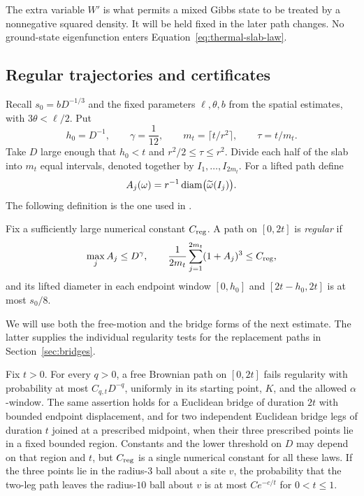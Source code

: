 The extra variable $W'$ is what permits a mixed Gibbs state to be
treated by a nonnegative squared density.  It will be held fixed
in the later path changes.  No ground-state eigenfunction enters
Equation~\eqref{eq:thermal-slab-law}.

\subsection{Regular trajectories and certificates}

Recall $s_0=bD^{-1/3}$ and the fixed parameters
$\ell,\theta,b$ from the spatial estimates, with
$3\theta<\ell/2$.  Put
\begin{equation}\label{eq:regularity-scales}
 h_0=D^{-1},\qquad \gamma=\frac1{12},\qquad
 m_t=\lceil t/r^2\rceil,\qquad \tau=t/m_t.
\end{equation}
Take $D$ large enough that $h_0<t$ and
$r^2/2\le\tau\le r^2$.  Divide each half of the slab into
$m_t$ equal intervals, denoted together by $I_1,\ldots,I_{2m_t}$.
For a lifted path define
\[
 A_j(\omega)=r^{-1}\operatorname{diam}\bigl(\widetilde\omega(I_j)\bigr).
\]
The following definition is the one used in
\citet[Section ``A stationary sample of hard-core paths,''
definition of a regular path]{HS}.

\begin{definition}\label{def:regular}
Fix a sufficiently large numerical constant $C_{\rm reg}$.
A path on $[0,2t]$ is \emph{regular} if
\begin{equation}\label{eq:regularity-tests}
 \max_j A_j\le D^\gamma,
 \qquad
 \frac1{2m_t}\sum_{j=1}^{2m_t}(1+A_j)^3\le C_{\rm reg},
\end{equation}
and its lifted diameter in each endpoint window
$[0,h_0]$ and $[2t-h_0,2t]$ is at most $s_0/8$.
\end{definition}

We will use both the free-motion and the bridge forms of the next
estimate.  The latter supplies the individual regularity tests
for the replacement paths in Section~\ref{sec:bridges}.

\begin{lemma}\label{lem:free-cutoffs}
Fix $t>0$.  For every $q>0$, a free Brownian path on $[0,2t]$
fails regularity with probability at most $C_{q,t}D^{-q}$,
uniformly in its starting point, $K$, and the allowed
$\alpha$-window.  The same assertion holds for a Euclidean
bridge of duration $2t$ with bounded endpoint displacement, and
for two independent Euclidean bridge legs of duration $t$
joined at a prescribed midpoint, when their three prescribed
points lie in a fixed bounded region.  Constants and the lower
threshold on $D$ may depend on that region and $t$, but
$C_{\rm reg}$ is a single numerical constant for all these laws.
If the three points lie in the radius-$3$ ball about a site $v$,
the probability that the two-leg path leaves the radius-$10$
ball about $v$ is at most $Ce^{-c/t}$ for $0<t\le1$.
\end{lemma}

